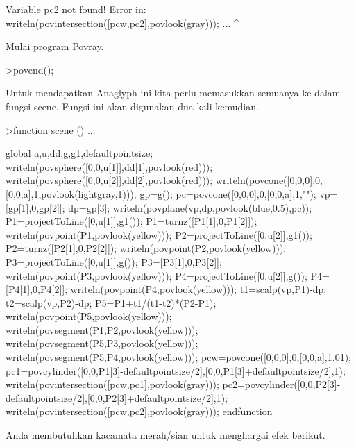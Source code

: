 \documentclass[a4paper,10pt]{article}
\begin{document}
\begin{eulernotebook}
\begin{eulercomment}
\begin{eulercomment}
\begin{eulercomment}
\begin{eulercomment}
\begin{eulercomment}
\begin{eulercomment}
\begin{eulercomment}
\begin{eulercomment}
\begin{eulercomment}
\begin{eulercomment}
\begin{eulercomment}
\begin{eulercomment}
\begin{eulercomment}
\begin{eulercomment}
\begin{eulercomment}
\begin{eulercomment}
\begin{eulerprompt}
\end{eulerprompt}
\begin{euleroutput}
  Variable pc2 not found!
  Error in:
  writeln(povintersection([pcw,pc2],povlook(gray))); ...
                                  ^
\end{euleroutput}
\begin{eulercomment}
Mulai program Povray.
\end{eulercomment}
\begin{eulerprompt}
>povend();
\end{eulerprompt}
\begin{eulercomment}
Untuk mendapatkan Anaglyph ini kita perlu memasukkan semuanya ke dalam
fungsi scene. Fungsi ini akan digunakan dua kali kemudian.
\end{eulercomment}
\begin{eulerprompt}
>function scene () ...
\end{eulerprompt}
\begin{eulerudf}
  global a,u,dd,g,g1,defaultpointsize;
  writeln(povsphere([0,0,u[1]],dd[1],povlook(red)));
  writeln(povsphere([0,0,u[2]],dd[2],povlook(red)));
  writeln(povcone([0,0,0],0,[0,0,a],1,povlook(lightgray,1)));
  gp=g();
  pc=povcone([0,0,0],0,[0,0,a],1,"");
  vp=[gp[1],0,gp[2]]; dp=gp[3];
  writeln(povplane(vp,dp,povlook(blue,0.5),pc));
  P1=projectToLine([0,u[1]],g1()); P1=turnz([P1[1],0,P1[2]]);
  writeln(povpoint(P1,povlook(yellow)));
  P2=projectToLine([0,u[2]],g1()); P2=turnz([P2[1],0,P2[2]]);
  writeln(povpoint(P2,povlook(yellow)));
  P3=projectToLine([0,u[1]],g()); P3=[P3[1],0,P3[2]];
  writeln(povpoint(P3,povlook(yellow)));
  P4=projectToLine([0,u[2]],g()); P4=[P4[1],0,P4[2]];
  writeln(povpoint(P4,povlook(yellow)));
  t1=scalp(vp,P1)-dp; t2=scalp(vp,P2)-dp; P5=P1+t1/(t1-t2)*(P2-P1);
  writeln(povpoint(P5,povlook(yellow)));
  writeln(povsegment(P1,P2,povlook(yellow)));
  writeln(povsegment(P5,P3,povlook(yellow)));
  writeln(povsegment(P5,P4,povlook(yellow)));
  pcw=povcone([0,0,0],0,[0,0,a],1.01);
  pc1=povcylinder([0,0,P1[3]-defaultpointsize/2],[0,0,P1[3]+defaultpointsize/2],1);
  writeln(povintersection([pcw,pc1],povlook(gray)));
  pc2=povcylinder([0,0,P2[3]-defaultpointsize/2],[0,0,P2[3]+defaultpointsize/2],1);
  writeln(povintersection([pcw,pc2],povlook(gray)));
  endfunction
\end{eulerudf}
\begin{eulercomment}
Anda membutuhkan kacamata merah/sian untuk menghargai efek berikut.
\end{eulercomment}
\begin{eulerprompt}

\end{eulerprompt}
\end{eulercomment}
\end{eulercomment}
\end{eulercomment}
\end{eulercomment}
\end{eulercomment}
\end{eulercomment}
\end{eulercomment}
\end{eulercomment}
\end{eulercomment}
\end{eulercomment}
\end{eulercomment}
\end{eulercomment}
\end{eulercomment}
\end{eulercomment}
\end{eulercomment}
\end{eulercomment}
\end{eulernotebook}
\end{document}
